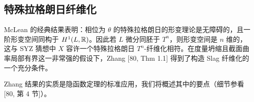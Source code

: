 \subsection{特殊拉格朗日纤维化}

McLean 的经典结果表明：相位为 $\theta$ 的特殊拉格朗日的形变理论是无障碍的，且一阶形变空间同构于 $H^1(L,\mathbb{R})$。因此若 $L$ 微分同胚于 $T^n$，则形变空间是 $n$ 维的，这与 SYZ 猜想中 $X$ 容许一个特殊拉格朗日 $T^n$-纤维化相符。在度量坍缩且截面曲率局部有界这一非常强的假设下，Zhang [80, Thm 1.1] 得到了构造 Slag 纤维化的一个充分条件。

Zhang 结果的实质是隐函数定理的标准应用，我们将概述其中的要点（细节参看 [80, 第 4 节]）。

